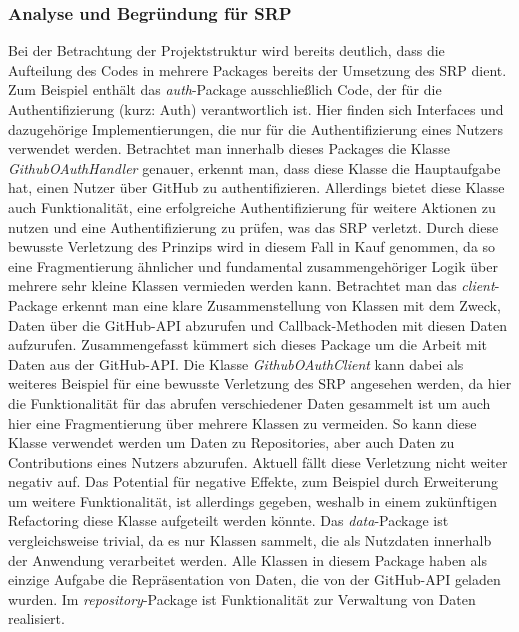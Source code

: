 \subsubsection{Analyse und Begründung für SRP}
\label{sec:Analyse_SRP}
Bei der Betrachtung der Projektstruktur wird bereits deutlich, dass die Aufteilung des Codes in mehrere Packages bereits der Umsetzung des SRP dient.
Zum Beispiel enthält das \textit{auth}-Package ausschließlich Code, der für die Authentifizierung (kurz: Auth) verantwortlich ist.
Hier finden sich Interfaces und dazugehörige Implementierungen, die nur für die Authentifizierung eines Nutzers verwendet werden.
Betrachtet man innerhalb dieses Packages die Klasse \textit{GithubOAuthHandler} genauer, erkennt man, dass diese Klasse die Hauptaufgabe hat, einen Nutzer über GitHub zu authentifizieren.
Allerdings bietet diese Klasse auch Funktionalität, eine erfolgreiche Authentifizierung für weitere Aktionen zu nutzen und eine Authentifizierung zu prüfen, was das SRP verletzt.
Durch diese bewusste Verletzung des Prinzips wird in diesem Fall  in Kauf genommen, da so eine Fragmentierung ähnlicher und fundamental zusammengehöriger Logik über mehrere sehr kleine Klassen vermieden werden kann.
\newline
Betrachtet man das \textit{client}-Package erkennt man eine klare Zusammenstellung von Klassen mit dem Zweck, Daten über die GitHub-API abzurufen und Callback-Methoden mit diesen Daten aufzurufen.
Zusammengefasst kümmert sich dieses Package um die Arbeit mit Daten aus der GitHub-API.
Die Klasse \textit{GithubOAuthClient} kann dabei als weiteres Beispiel für eine bewusste Verletzung des SRP angesehen werden, da hier die Funktionalität für das abrufen verschiedener Daten gesammelt ist um auch hier eine Fragmentierung über mehrere Klassen zu vermeiden. 
So kann diese Klasse verwendet werden um Daten zu Repositories, aber auch Daten zu Contributions eines Nutzers abzurufen.
Aktuell fällt diese Verletzung nicht weiter negativ auf.
Das Potential für negative Effekte, zum Beispiel durch Erweiterung um weitere Funktionalität, ist allerdings gegeben, weshalb in einem zukünftigen Refactoring diese Klasse aufgeteilt werden könnte.
\newline
Das \textit{data}-Package ist vergleichsweise trivial, da es nur Klassen sammelt, die als Nutzdaten innerhalb der Anwendung verarbeitet werden.
Alle Klassen in diesem Package haben als einzige Aufgabe die Repräsentation von Daten, die von der GitHub-API geladen wurden.
\newline
Im \textit{repository}-Package ist Funktionalität zur Verwaltung von Daten realisiert.
